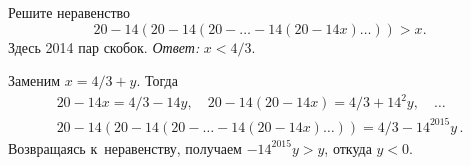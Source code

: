 \problem
Решите неравенство
\[
    20 - 14 (20 - 14 (20 - \ldots - 14 (20 - 14x) \ldots )) > x
.\]
Здесь 2014 пар скобок.
\solution
\emph{Ответ:} $x < 4 / 3$.
\par
Заменим $x = 4 / 3 + y$.
Тогда
\begin{gather*}
    20 - 14 x = 4/3 - 14 y
,\quad
    20 - 14 (20 - 14x) = 4/3 + 14^2 y
,\quad\ldots\\
    20 - 14 (20 - 14 (20 - \ldots - 14 (20 - 14x) \ldots ))
=
    4 / 3 - 14^{2015} y
\,.\end{gather*}
Возвращаясь к~неравенству, получаем $-14^{2015} y > y$, откуда $y < 0$.
\endproblem
